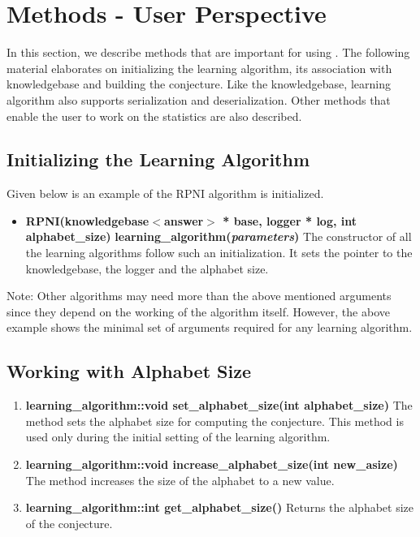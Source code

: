 \section{Methods - User Perspective}

In this section, we describe methods that are important for using \libalf. The following material elaborates on initializing the learning algorithm, its association with knowledgebase and building the conjecture. Like the knowledgebase, learning algorithm also supports serialization and deserialization. Other methods that enable the user to work on the statistics are also described.

\subsection*{Initializing the Learning Algorithm}
Given below is an example of the RPNI algorithm is initialized. 
\begin{itemize}
 \item \textbf{RPNI(knowledgebase$<$answer$>$ * base, logger * log, int alphabet\_size)} \vskip 1pt
\textbf{learning\_algorithm(\emph{parameters})} \vskip 1pt
	The constructor of all the learning algorithms follow such an initialization. It sets the pointer to the knowledgebase, the logger and the alphabet size. \\
\end{itemize}
Note: Other algorithms may need more than the above mentioned arguments since they depend on the working of the algorithm itself. However, the above example shows the minimal set of arguments required for any learning algorithm. 

\subsection*{Working with Alphabet Size}

\begin{enumerate}
 \item \textbf{learning\_algorithm::void set\_alphabet\_size(int alphabet\_size)} \vskip 1pt
	The method sets the alphabet size for computing the conjecture. This method is used only during the initial setting of the learning algorithm. 

 \item \textbf{learning\_algorithm::void increase\_alphabet\_size(int new\_asize)} \vskip 1pt
	The method increases the size of the alphabet to a new value.

 \item \textbf{learning\_algorithm::int get\_alphabet\_size()} \vskip 1pt
	Returns the alphabet size of the conjecture.
\end{enumerate}

